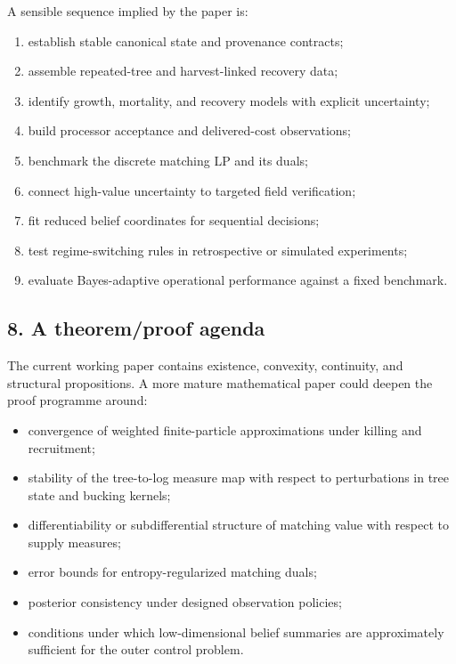 A sensible sequence implied by the paper is:

\begin{enumerate}
\def\labelenumi{\arabic{enumi}.}
\tightlist
\item
  establish stable canonical state and provenance contracts;
\item
  assemble repeated-tree and harvest-linked recovery data;
\item
  identify growth, mortality, and recovery models with explicit uncertainty;
\item
  build processor acceptance and delivered-cost observations;
\item
  benchmark the discrete matching LP and its duals;
\item
  connect high-value uncertainty to targeted field verification;
\item
  fit reduced belief coordinates for sequential decisions;
\item
  test regime-switching rules in retrospective or simulated experiments;
\item
  evaluate Bayes-adaptive operational performance against a fixed benchmark.
\end{enumerate}

\subsection{8. A theorem/proof agenda}\label{a-theoremproof-agenda}

The current working paper contains existence, convexity, continuity, and
structural propositions. A more mature mathematical paper could deepen the
proof programme around:

\begin{itemize}
\tightlist
\item
  convergence of weighted finite-particle approximations under killing and
  recruitment;
\item
  stability of the tree-to-log measure map with respect to perturbations in
  tree state and bucking kernels;
\item
  differentiability or subdifferential structure of matching value with respect
  to supply measures;
\item
  error bounds for entropy-regularized matching duals;
\item
  posterior consistency under designed observation policies;
\item
  conditions under which low-dimensional belief summaries are approximately
  sufficient for the outer control problem.
\end{itemize}

